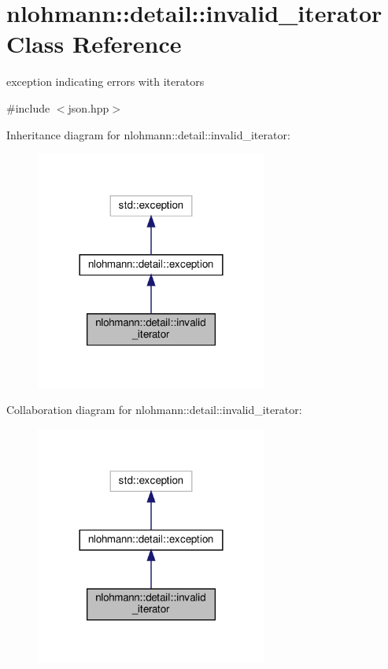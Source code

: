 \hypertarget{classnlohmann_1_1detail_1_1invalid__iterator}{}\section{nlohmann\+:\+:detail\+:\+:invalid\+\_\+iterator Class Reference}
\label{classnlohmann_1_1detail_1_1invalid__iterator}


exception indicating errors with iterators  




{\ttfamily \#include $<$json.\+hpp$>$}



Inheritance diagram for nlohmann\+:\+:detail\+:\+:invalid\+\_\+iterator\+:
\nopagebreak
\begin{figure}[H]
\begin{center}
\leavevmode
\includegraphics[width=216pt]{classnlohmann_1_1detail_1_1invalid__iterator__inherit__graph}
\end{center}
\end{figure}


Collaboration diagram for nlohmann\+:\+:detail\+:\+:invalid\+\_\+iterator\+:
\nopagebreak
\begin{figure}[H]
\begin{center}
\leavevmode
\includegraphics[width=216pt]{classnlohmann_1_1detail_1_1invalid__iterator__coll__graph}
\end{center}
\end{figure}
